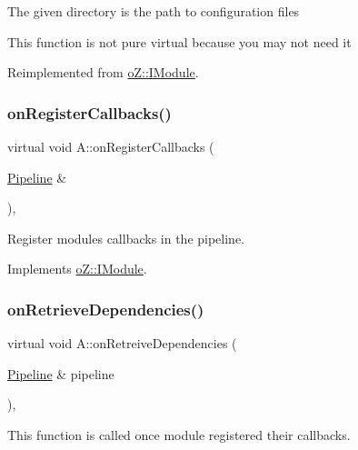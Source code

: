 The given directory is the path to configuration files

This function is not pure virtual because you may not need it 

Reimplemented from \mbox{\hyperlink{classo_z_1_1_i_module_a61a2cc76594401ed2f50931a6a6b76f3}{o\+Z\+::\+I\+Module}}.

\mbox{\label{class_a_ac82f8db798576ee2eff8b6b91b77c239}} 
\subsubsection{\texorpdfstring{onRegisterCallbacks()}{onRegisterCallbacks()}}
{\footnotesize\ttfamily virtual void A\+::on\+Register\+Callbacks (\begin{DoxyParamCaption}\item[{\mbox{\hyperlink{classo_z_1_1_pipeline}{Pipeline}} \&}]{ }\end{DoxyParamCaption})\hspace{0.3cm}{\ttfamily [inline]}, {\ttfamily [virtual]}}



Register module\textquotesingle{}s callbacks in the pipeline. 



Implements \mbox{\hyperlink{classo_z_1_1_i_module_a3dc905faa6df5e22eecc6ffbc923fd95}{o\+Z\+::\+I\+Module}}.

\mbox{\label{class_a_a968473c1dcccfee5502df74229fb263b}} 
\subsubsection{\texorpdfstring{onRetrieveDependencies()}{onRetrieveDependencies()}}
{\footnotesize\ttfamily virtual void A\+::on\+Retreive\+Dependencies (\begin{DoxyParamCaption}\item[{\mbox{\hyperlink{classo_z_1_1_pipeline}{Pipeline}} \&}]{pipeline }\end{DoxyParamCaption})\hspace{0.3cm}{\ttfamily [inline]}, {\ttfamily [virtual]}}



This function is called once module registered their callbacks. 

